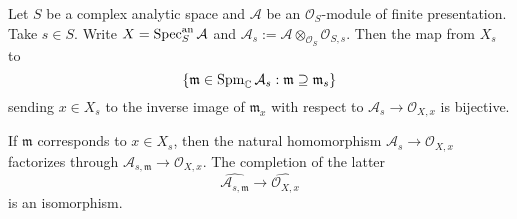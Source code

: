\begin{proposition}\label{prop-specanlocalringcompletion}
    Let $S$ be a complex analytic space and $\mathcal{A}$ be an $\mathcal{O}_S$-module of finite presentation. Take $s\in S$.
    Write $X=\operatorname{Spec}^{\mathrm{an}}_S \mathcal{A}$ and $\mathcal{A}_s:=\mathcal{A}\otimes_{\mathcal{O}_S}\mathcal{O}_{S,s}$. Then the map from $X_s$ to 
    \[
        \left\{ \mathfrak{m}\in \operatorname{Spm}_{\mathbb{C}} \mathcal{A}_s : \mathfrak{m}\supseteq\mathfrak{m}_s  \right\}
    \]
    sending $x\in X_s$ to the inverse image of $\mathfrak{m}_x$ with respect to $\mathcal{A}_s\rightarrow \mathcal{O}_{X,x}$ is bijective.

    If $\mathfrak{m}$ corresponds to $x\in X_s$, then the natural homomorphism $\mathcal{A}_s\rightarrow \mathcal{O}_{X,x}$ factorizes through $\mathcal{A}_{s,\mathfrak{m}}\rightarrow  \mathcal{O}_{X,x}$. The completion of the latter
    \[
        \widehat{\mathcal{A}_{s,\mathfrak{m}}}\rightarrow   \widehat{\mathcal{O}_{X,x}}
    \]
    is an isomorphism.
\end{proposition}
